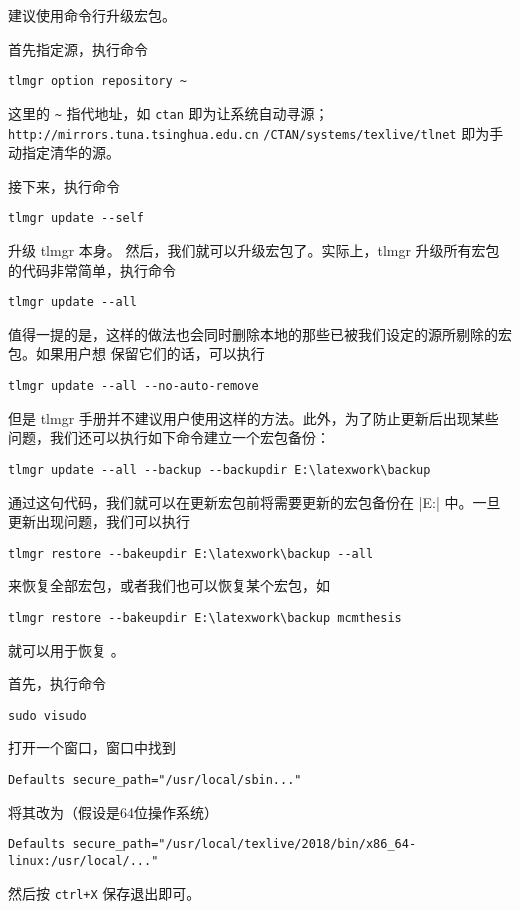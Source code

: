 建议使用命令行升级宏包。

首先指定源，执行命令
\begin{verbatim}
tlmgr option repository ~
\end{verbatim}
这里的 \verb|~| 指代地址，如 \verb|ctan| 即为让系统自动寻源；
\verb|http://mirrors.tuna.tsinghua.edu.cn| 
\verb|/CTAN/systems/texlive/tlnet| 即为手动指定清华的源。

接下来，执行命令
\begin{verbatim}
tlmgr update --self
\end{verbatim}
升级 tlmgr 本身。 然后，我们就可以升级宏包了。实际上，tlmgr
升级所有宏包的代码非常简单，执行命令
\begin{verbatim}
tlmgr update --all
\end{verbatim}

值得一提的是，这样的做法也会同时删除本地的那些已被我们设定的源所剔除的宏包。如果用户想
保留它们的话，可以执行

\begin{verbatim}
tlmgr update --all --no-auto-remove
\end{verbatim}
但是 tlmgr
手册并不建议用户使用这样的方法。此外，为了防止更新后出现某些问题，我们还可以执行如下命令建立一个宏包备份：

\begin{verbatim}
tlmgr update --all --backup --backupdir E:\latexwork\backup
\end{verbatim}
通过这句代码，我们就可以在更新宏包前将需要更新的宏包备份在
|E:\latexwork\backup| 中。一旦更新出现问题，我们可以执行

\begin{verbatim}
tlmgr restore --bakeupdir E:\latexwork\backup --all
\end{verbatim}
来恢复全部宏包，或者我们也可以恢复某个宏包，如

\begin{verbatim}
tlmgr restore --bakeupdir E:\latexwork\backup mcmthesis
\end{verbatim}
就可以用于恢复 。

首先，执行命令
\begin{verbatim}
sudo visudo
\end{verbatim}
打开一个窗口，窗口中找到
\begin{verbatim}
Defaults secure_path="/usr/local/sbin..."
\end{verbatim}
将其改为（假设是64位操作系统）
\begin{verbatim}
Defaults secure_path="/usr/local/texlive/2018/bin/x86_64-linux:/usr/local/..."
\end{verbatim}
然后按 \verb|ctrl+X| 保存退出即可。

